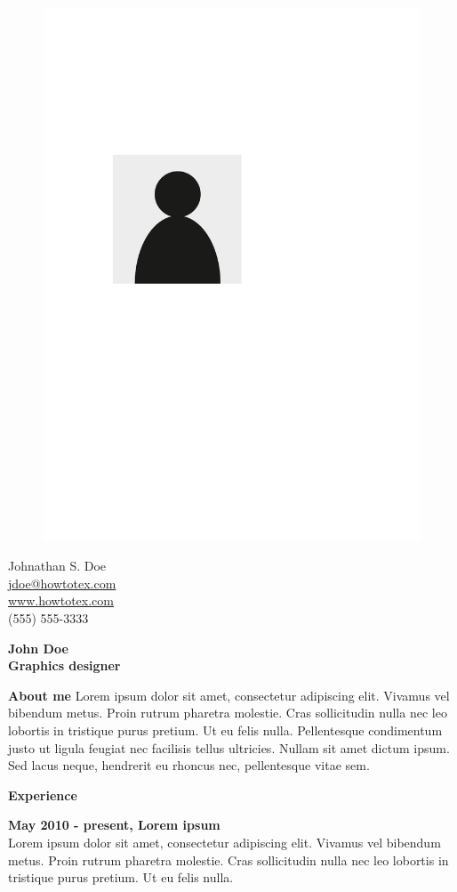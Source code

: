 \documentclass[a4paper,12pt,final]{memoir}
\newcommand{\Sep}{\vspace{1.5em}}
\newcommand{\SmallSep}{\vspace{0.5em}}
\newenvironment{AboutMe}
	{\ignorespaces\textbf{\color{RoyalBlue} About me}}
	{\Sep\ignorespacesafterend}
\newcommand{\CVSection}[1]
	{\Large\textbf{#1}\par
	\SmallSep\normalsize\normalfont}
\newcommand{\CVItem}[1]
	{\textbf{\color{RoyalBlue} #1}}
\begin{document}
\begin{figure}
	\hfill
	\includegraphics[width=0.6\columnwidth]{photo}
	\vspace{-7cm}
\end{figure}

\begin{flushright}\small
	Johnathan S. Doe \\
	\url{jdoe@howtotex.com}  \\
	\url{www.howtotex.com} \\
	(555) 555-3333
\end{flushright}\normalsize
\framebreak


\Huge\bfseries {\color{RoyalBlue} John Doe} \\
\Large\bfseries  Graphics designer \\

\normalsize\normalfont

\begin{AboutMe}
Lorem ipsum dolor sit amet, consectetur adipiscing elit. Vivamus vel bibendum metus. Proin rutrum pharetra molestie. Cras sollicitudin nulla nec leo lobortis in tristique purus pretium. Ut eu felis nulla. Pellentesque condimentum justo ut ligula feugiat nec facilisis tellus ultricies. Nullam sit amet dictum ipsum. Sed lacus neque, hendrerit eu rhoncus nec, pellentesque vitae sem.
\end{AboutMe}

\CVSection{Experience}
\CVItem{May 2010 - present, Lorem ipsum}\\
Lorem ipsum dolor sit amet, consectetur adipiscing elit. Vivamus vel bibendum metus. Proin rutrum pharetra molestie. Cras sollicitudin nulla nec leo lobortis in tristique purus pretium. Ut eu felis nulla.
\SmallSep
\end{document}

